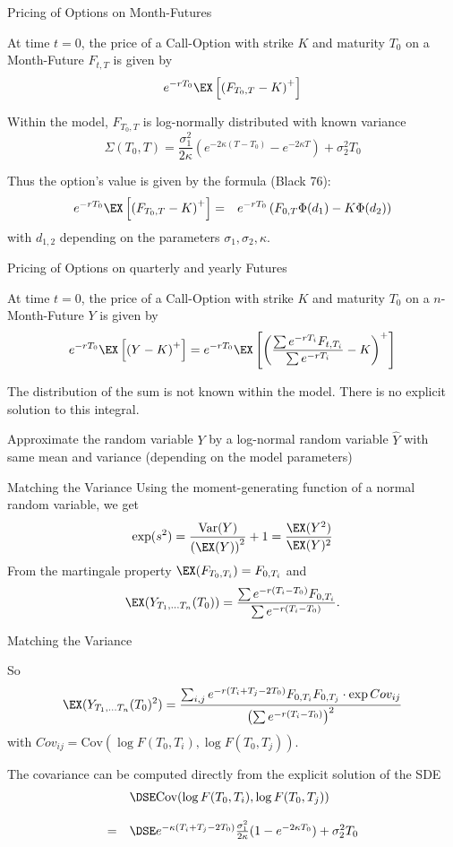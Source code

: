 {Pricing of Options on Month-Futures}
\item<1-> At time $t=0$, the price of a  Call-Option with strike $K$ and maturity $T_0$ on a Month-Future $F_{t,T}$ is given by
$$e^{-rT_0}\EX\left[\left(F_{T_0,T}-K\right)^+\right]$$
\item<2-> Within the model,  $F_{T_0,T}$ is log-normally distributed with known variance
$$
\Sigma(T_0,T) =   \frac{\sigma_1^2}{2\kappa}(e^{-2\kappa (T-T_0)}-e^{-2\kappa T})+\sigma_2^2T_0
$$
\item<3-> Thus the option's value is given by the formula (Black 76):
\begin{eqnarray*}
e^{-rT_0}\EX\left[\left(F_{T_0,T}-K\right)^+\right] & = &
e^{-rT_0}\left(F_{0,T}\Phi(d_1)-K\Phi(d_2)\right)
\end{eqnarray*}with $d_{1,2}$ depending on the parameters $\sigma_1, \sigma_2, \kappa$.

{Pricing of Options on quarterly and yearly Futures}
\item<1-> At time $t=0$, the price of a  Call-Option with strike $K$ and maturity $T_0$ on a $n$-Month-Future
$Y$ is given by
$$
e^{-rT_0}\EX\left[\left(Y-K\right)^+\right]=e^{-rT_0}\EX
\left[\left(\frac{\sum e^{-rT_i}F_{t,T_i}}{\sum e^{-rT_i}}-K\right)^+\right]$$
\item<2-> The distribution of the sum is not known within the model. There is no explicit solution to this integral.
\item<3-> Approximate the random variable $Y$ by a log-normal random variable $\hat{Y}$
with same mean and variance (depending on the model parameters)

{Matching the Variance}
Using the moment-generating function of a normal random variable, we get
$$
\exp (s^2) = \frac{\textrm{Var}(Y)}{\left(\EX (Y)\right)^2} + 1  = \frac{\EX(Y^2)}{\EX(Y)^2}
$$
From the martingale property
$\EX (F_{T_0,T_i}) =  F_{0,T_i} $ and
$$ \EX (Y_{T_1, \ldots T_n}(T_0))  =
\frac{\sum e^{-r(T_i-T_0)} F_{0,T_i}}{\sum e^{-r(T_i-T_0)}}.$$

{Matching the Variance}

So
$$
\EX (Y_{T_1, \ldots T_n}(T_0)^2)
=  \frac{\sum_{i, j}e^{-r(T_i+T_j-2T_0)} F_{0,T_i}F_{0,T_j}\cdot \exp Cov_{ij}}{\left(\sum e^{-r(T_i-T_0)}\right)^2}
$$ with
$Cov_{ij} = \textrm{Cov}(\log F(T_0,T_i), \log F(T_0,T_j))$.

The covariance can be computed directly from the explicit solution of the SDE
$$\begin{array}{ll}
& \DSE \textrm{Cov}(\log F(T_0,T_i), \log F(T_0,T_j)) \\*[12pt]
 = & \DSE
 e^{-\kappa(T_i+T_j-2T_0)}\frac{\sigma_1^2}{2\kappa}(1-e^{-2\kappa T_0})+\sigma_2^2 T_0
\end{array}
$$


